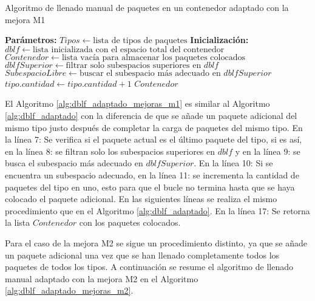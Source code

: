 \begin{algorithm}[H]
    \caption{Algoritmo de llenado manual de paquetes en un contenedor adaptado con la mejora M1}
    \label{alg:dblf_adaptado_mejoras_m1}
    \begin{algorithmic}[1]
        \State \textbf{Parámetros:} $Tipos \gets \text{lista de tipos de paquetes}$
        \State \textbf{Inicialización:} $dblf \gets \text{lista inicializada con el espacio total del contenedor}$
        \State $Contenedor \gets \text{lista vacía para almacenar los paquetes colocados}$
        \State {} 
        \State $dblfSuperior \gets \text{filtrar solo subespacios superiores en } dblf$
        \State $SubespacioLibre \gets \text{buscar el subespacio más adecuado en } dblfSuperior$
        \State $tipo.cantidad \gets tipo.cantidad + 1$
        \EndIf
        \EndIf
        \EndFor
        \State {} 
        \EndFor
        \State \Return $Contenedor$
    \end{algorithmic}
\end{algorithm}

El Algoritmo \ref{alg:dblf_adaptado_mejoras_m1} es similar al Algoritmo \ref{alg:dblf_adaptado} con la diferencia de que se añade un paquete adicional del mismo tipo justo después de completar la carga de paquetes del mismo tipo. En la línea 7: Se verifica si el paquete actual es el último paquete del tipo, si es así, en la línea 8: se filtran solo los subespacios superiores en $dblf$ y en la línea 9: se busca el subespacio más adecuado en $dblfSuperior$. En la línea 10: Si se encuentra un subespacio adecuado, en la línea 11: se incrementa la cantidad de paquetes del tipo en uno, esto para que el bucle no termina hasta que se haya colocado el paquete adicional. En las siguientes líneas se realiza el mismo procedimiento que en el Algoritmo \ref{alg:dblf_adaptado}. En la línea 17: Se retorna la lista $Contenedor$ con los paquetes colocados.

Para el caso de la mejora M2 se sigue un procedimiento distinto, ya que se añade un paquete adicional una vez que se han llenado completamente todos los paquetes de todos los tipos. A continuación se resume el algoritmo de llenado manual adaptado con la mejora M2 en el Algoritmo \ref{alg:dblf_adaptado_mejoras_m2}.

